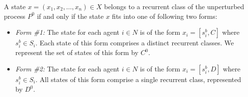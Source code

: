 \begin{lemma}\label{l:recurrent}
A state $x = (x_1,x_2,\ldots,x_n)\in X$ belongs to a recurrent class of the unperturbed process $P^0$ if and only if the state $x$ fits into one of following two forms:
%
\begin{itemize}%
%
\item \emph{Form \#1:} The state for each agent $i \in N$ is of the form $x_i = \left[s_i^b,C\right]$ where $s_i^b \in S_i$. Each state of this form comprises a distinct recurrent classes.  We represent the set of states of this form by $C^0$.
%
\item \emph{Form \#2:} The state for each agent $i \in N$ is of the form $x_i = \left[s_i^b,D\right]$  where $s_i^b \in S_i$. All states of this form comprise a single recurrent class, represented by $D^0$. 
%
\end{itemize}
%
\end{lemma}
%
\vspace{.2cm}
%
